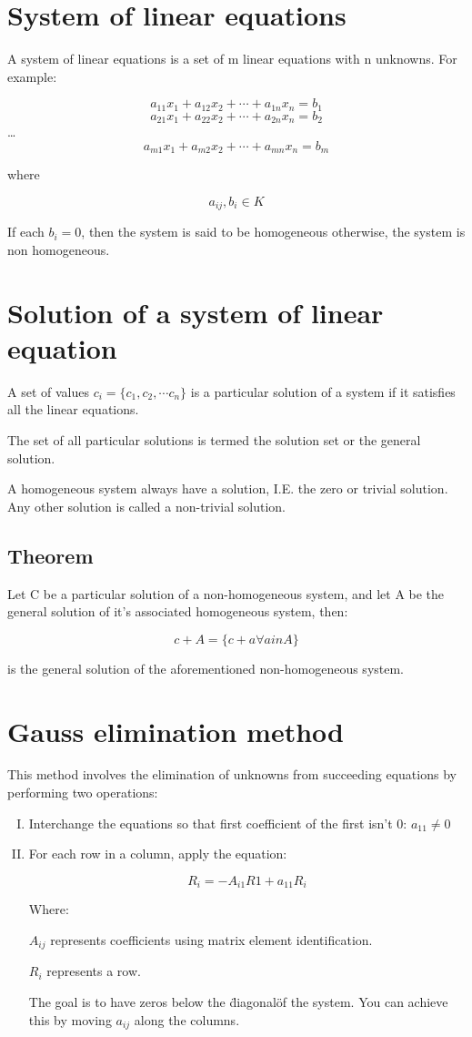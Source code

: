 \documentclass{book}
\begin{document}
\section{System of linear equations}

A system of linear equations is a set of m linear equations with n unknowns. For example:

\[a_{11} x_1 + a_{12} x_2 + \cdots + a_{1n} x_n = b_1\]
\[a_{21} x_1 + a_{22} x_2 + \cdots + a_{2n} x_n = b_2\]
\ldots
\[a_{m1} x_1 + a_{m2} x_2 + \cdots + a_{mn} x_n = b_m\]

where

\[a_{ij}, b_i \in K\]

If each \(b_i = 0\), then the system is said to be homogeneous otherwise, the system is non homogeneous.

\section{Solution of a system of linear equation}
A set of values \(c_i = \{c_1, c_2, \cdots c_n\}\) is a particular solution of a system if it satisfies all the linear equations.

The set of all particular solutions is termed the solution set or the general solution.

A homogeneous system always have a solution, I.E. the zero or trivial solution. Any other solution is called a non-trivial solution.

\subsection{Theorem}

Let C be a particular solution of a non-homogeneous system, and let A be the general solution of it's associated homogeneous system, then:

\[c + A = \{c + a \forall a in A\}\]

is the general solution of the aforementioned non-homogeneous system.

\section{Gauss elimination method}

This method involves the elimination of unknowns from succeeding equations by performing two operations:

\begin{enumerate}[I.]
	\item Interchange the equations so that first coefficient of the first isn't 0: \(a_{11} \ne 0\)
	\item For each row in a column, apply the equation:

		\[R_i = -A_{i1}R1 + a_{11}R_i\]

		Where:

		\(A_{ij}\) represents coefficients using matrix element identification.

		\(R_i\) represents a row.

		The goal is to have zeros below the \"diagonal\" of the system. You can achieve this by moving \(a_{ij}\) along the columns.
\end{enumerate}
\end{document}
